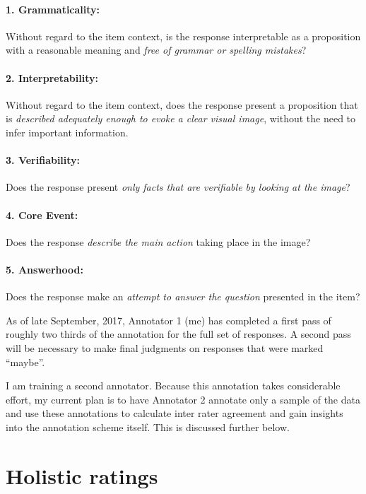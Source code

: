 \documentclass[11pt]{article}
\begin{document}
\paragraph{1. Grammaticality:} Without regard to the item context, is the response interpretable as a proposition with a reasonable meaning and \textit{free of grammar or spelling mistakes}?

\paragraph{2. Interpretability:} Without regard to the item context, does the response present a proposition that is \textit{described adequately enough to evoke a clear visual image}, without the need to infer important information.

\paragraph{3. Verifiability:} Does the response present \textit{only facts that are verifiable by looking at the image}? 

\paragraph{4. Core Event:} Does the response \textit{describe the main action} taking place in the image?

\paragraph{5. Answerhood:} Does the response make an \textit{attempt to answer the question} presented in the item?

As of late September, 2017, Annotator 1 (me) has completed a first pass of roughly two thirds of the annotation for the full set of responses. A second pass will be necessary to make final judgments on responses that were marked ``maybe''.

I am training a second annotator. Because this annotation takes considerable effort, my current plan is to have Annotator 2 annotate only a sample of the data and use these annotations to calculate inter rater agreement and gain insights into the annotation scheme itself. This is discussed further below. 

\section{Holistic ratings}
\end{document}
